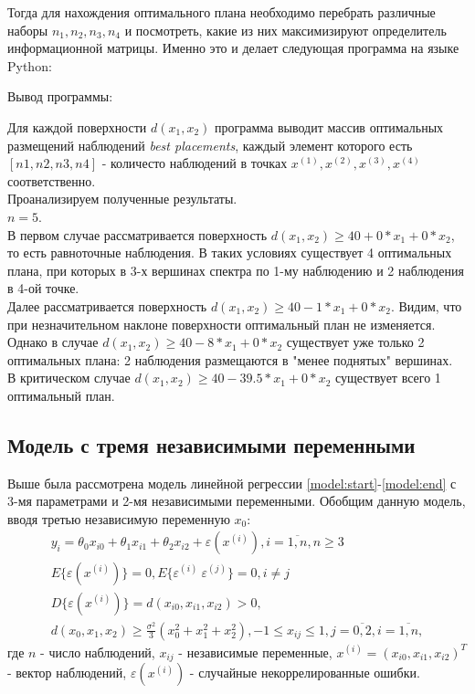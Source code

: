 	 Тогда для нахождения оптимального плана необходимо перебрать различные наборы $n_1, n_2, n_3, n_4$ и посмотреть, какие из них максимизируют определитель информационной матрицы. Именно это и делает следующая программа на языке Python:
	 
	
	 
	 Вывод программы:
	 


	Для каждой поверхности $d(x_1, x_2)$ программа выводит массив оптимальных размещений наблюдений \textit{best placements}, каждый элемент которого есть $[n1, n2, n3, n4]$ -  количесто наблюдений в точках $x^{(1)}, x^{(2)}, x^{(3)}, x^{(4)}$ соответственно.\\
	Проанализируем полученные результаты.\\
	$n = 5$.\\
	В первом случае рассматривается поверхность $d(x_1, x_2) \ge 40 + 0*x_1 + 0*x_2$, то есть равноточные наблюдения. В таких условиях существует 4 оптимальных плана, при которых в 3-х вершинах спектра по 1-му наблюдению и 2 наблюдения в 4-ой точке. \\
	Далее рассматривается поверхность $d(x_1, x_2) \ge 40 - 1*x_1 + 0*x_2$. Видим, что при незначительном наклоне поверхности оптимальный план не изменяется. \\
	Однако в случае $d(x_1, x_2) \ge 40 - 8*x_1 + 0*x_2$ существует уже только 2 оптимальных плана: 2 наблюдения размещаются в "менее поднятых" вершинах.\\
	В критическом случае $d(x_1, x_2) \ge 40 - 39.5*x_1 + 0*x_2$ существует всего 1 оптимальный план.
	
\subsection{Модель с тремя независимыми переменными}
	Выше была рассмотрена модель линейной регрессии \eqref{model:start}-\eqref{model:end} с 3-мя параметрами и 2-мя независимыми переменными.
	Обобщим данную модель, вводя третью независимую переменную $x_0$:
	\begin{gather} \label{model-3x:start}
		y_i = \theta_0 x_{i0} + \theta_1 x_{i1} + \theta_2 x_{i2} + \varepsilon(x^{(i)}), i = \overline{1, n}, n \ge 3 \\
		E\{ \varepsilon(x^{(i)}) \} = 0, E\{ \varepsilon^{(i)}\ \varepsilon^{(j)} \} = 0, i \ne j \\
		D\{ \varepsilon(x^{(i)}) \} = d(x_{i0}, x_{i1}, x_{i2}) > 0, \\
		d(x_0, x_1, x_2) \ge \frac{\sigma^2}{3}(x_0^2 + x_1^2 + x_2^2) \label{model-3x:end},
		-1 \le x_{ij} \le 1, j = \overline{0, 2}, i = \overline{1, n},
	\end{gather}
	где $n$ - число наблюдений, $x_{ij}$ - независимые переменные, $x^{(i)} = (x_{i0}, x_{i1}, x_{i2})^T$ - вектор наблюдений, $\varepsilon(x^{(i)})$ - случайные некоррелированные ошибки.
	
